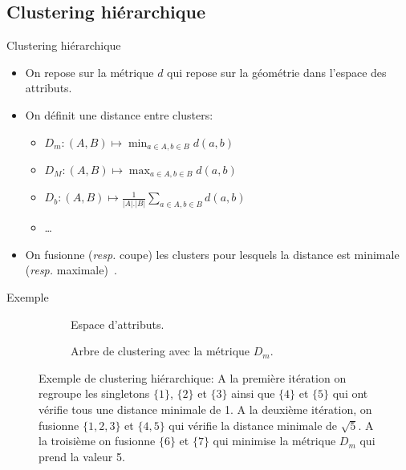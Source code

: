 \documentclass[8pt]{beamer}
\begin{document}
		\subsection{Clustering hiérarchique}
			\begin{frame}{Clustering hiérarchique}
				\begin{itemize}
					\item<1-> On repose sur la métrique \(d\) qui repose sur la géométrie dans l'espace des attributs.
					\item<2-> On définit une distance entre clusters:
						\begin{itemize}
							\item<3-> \(D_m: (A, B) \mapsto \min_{a\in A, b\in B} d(a,b)\)
							\item<4-> \(D_M: (A, B) \mapsto \max_{a\in A, b\in B} d(a,b)\)
							\item<5-> \(D_b: (A, B) \mapsto \frac{1}{\vert A \vert.\vert B \vert}\sum_{a\in A, b\in B} d(a,b)\)
							\item<6-> \dots
						\end{itemize}
					\item<7-> On fusionne (\textit{resp.} coupe) les clusters pour lesquels la distance est minimale (\textit{resp.} maximale)~\cite{hastie2009unsupervised,ward1963hierarchical}.
				\end{itemize}
			\end{frame}
			\begin{frame}{Exemple}
				\begin{figure}[H]
					\begin{center}
						\begin{subfigure}[t]{0.49\textwidth}
							\centering
							
							\caption*{Espace d'attributs.}
						\end{subfigure}
						\begin{subfigure}[t]{0.49\textwidth}
							\centering
							
							\caption*{Arbre de clustering avec la métrique \(D_m\).}
						\end{subfigure}
					\end{center}
					\caption*{Exemple de clustering hiérarchique: A la première itération on regroupe les singletons \(\{1\}\), \(\{2\}\) et \(\{3\}\) ainsi que \(\{4\}\) et \(\{5\}\) qui ont vérifie tous une distance minimale de 1. A la deuxième itération, on fusionne \(\{1, 2, 3\}\) et \(\{4, 5\}\) qui vérifie la distance minimale de \(\sqrt{5}\). A la troisième on fusionne \(\{6\}\) et \(\{7\}\) qui minimise la métrique \(D_m\) qui prend la valeur 5.}
				\end{figure}
			\end{frame}
\end{document}

